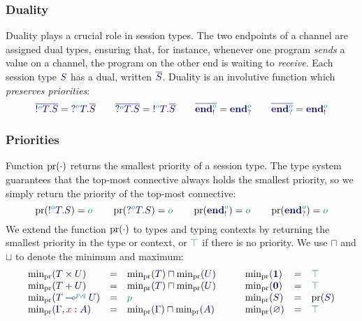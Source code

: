 \documentclass[main.tex]{subfiles}
\begin{document}
\subsubsection*{Duality}
Duality plays a crucial role in session types. The two endpoints of a channel are assigned dual types, ensuring that, for instance, whenever one program \emph{sends} a value on a channel, the program on the other end is waiting to \emph{receive}. Each session type $\ty{S}$ has a dual, written $\ty{\co{S}}$. Duality is an involutive function which \emph{preserves priorities}:
\[
  \ty{\co{\tysend[\cs{o}]{T}{S}}} = \ty{\tyrecv[\cs{o}]{T}{\co{S}}}
  \qquad
  \ty{\co{\tyrecv[\cs{o}]{T}{S}}} = \ty{\tysend[\cs{o}]{T}{\co{S}}}
  \qquad
  \ty{\co{\tyends[\cs{o}]}} = \ty{\tyendr[\cs{o}]}
  \qquad
  \ty{\co{\tyendr[\cs{o}]}} = \ty{\tyends[\cs{o}]}
\]

\subsubsection*{Priorities}
Function $\operatorname{pr}(\cdot)$ returns the smallest priority of a session type. The type system guarantees that the top-most connective always holds the smallest priority, so we simply return the priority of the top-most connective:
\[
  \pr(\ty{\tysend[\cs{o}]{T}{S}}) = \cs{o}
  \qquad
  \pr(\ty{\tyrecv[\cs{o}]{T}{S}}) = \cs{o}
  \qquad
  \pr(\ty{\tyends[\cs{o}]})       = \cs{o}
  \qquad
  \pr(\ty{\tyendr[\cs{o}]})       = \cs{o}
\]
We extend the function $\operatorname{pr}(\cdot)$ to types and typing contexts by returning the smallest priority in the type or context, or $\cs{\top}$ if there is no priority. We use $\sqcap$ and $\sqcup$ to denote the minimum and maximum:
\[
\begin{array}{lcl}
  \minpr(\ty{\typrod{T}{U}})                 & = & \minpr({\ty{T}})\sqcap\minpr({\ty{U}}) \\
  \minpr(\ty{\tysum{T}{U}})                  & = & \minpr({\ty{T}})\sqcap\minpr({\ty{U}}) \\
  \minpr(\ty{\tylolli[\cs{p},\cs{q}]{T}{U}}) & = & \cs{p} \\
  \minpr(\ty{\Gamma}, \tmty{x}{A})           & = & \minpr(\ty{\Gamma})\sqcap\minpr(\ty{A})
\end{array}
\qquad
\begin{array}{lcl}
  \minpr(\ty{\tyunit})                       & = & \ptop \\
  \minpr(\ty{\tyvoid})                       & = & \ptop \\
  \minpr(\ty{S})                             & = & \pr(\ty{S}) \\
  \minpr(\ty{\emptyenv})                     & = & \ptop
\end{array}
\]
\end{document}
